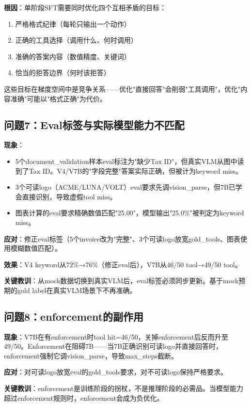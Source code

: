 \documentclass[fontset=none,11pt,a4paper]{ctexart}
\begin{document}
\textbf{根因}：单阶段SFT需要同时优化四个互相矛盾的目标：
\begin{enumerate}[label=(\arabic*),nosep]
    \item 严格格式纪律（每轮只输出一个动作）
    \item 正确的工具选择（调用什么、何时调用）
    \item 准确的答案内容（数值精度、关键词）
    \item 恰当的拒答边界（何时该拒答）
\end{enumerate}
这些目标在梯度空间中是竞争关系------优化"直接回答"会削弱"工具调用"，优化"内容准确"可能以"格式正确"为代价。

\subsection{问题7：Eval标签与实际模型能力不匹配}

\textbf{现象}：
\begin{itemize}[nosep]
    \item 5个document\_validation样本eval标注为"缺少Tax ID"，但真实VLM从图中读到了Tax ID。V4/V7B的"字段完整"答案实际正确，但被计为keyword miss。
    \item 3个可读logo（ACME/LUNA/VOLT）eval要求先调vision\_parse，但7B已学会直接识别，导致虚假tool miss。
    \item 图表计算的eval要求精确数值匹配"25.00"，模型输出"25.0\%"被判定为keyword miss。
\end{itemize}

\textbf{应对}：修正eval标签（5个invoice改为"完整"、3个可读logo放宽gold\_tools、图表使用模糊数值匹配）。

\textbf{效果}：V4 keyword从72\%→76\%（修正eval后），V7B从46/50 tool→49/50 tool。

\textbf{关键教训}：从mock数据切换到真实VLM后，eval标签必须同步更新。基于mock预期的gold label在真实VLM场景下不再准确。

\subsection{问题8：enforcement的副作用}

\textbf{现象}：V7B在有enforcement时tool hit=46/50，关掉enforcement后反而升至49/50。Enforcement在阻碍7B------当7B正确识别可读logo并直接回答时，enforcement强制它调vision\_parse，导致max\_steps截断。

\textbf{应对}：对可读logo放宽eval的gold\_tools要求，对不可读logo保持严格要求。

\textbf{关键教训}：enforcement是训练阶段的拐杖，不是推理阶段的必需品。当模型能力超过enforcement规则时，enforcement会成为负优化。
\end{document}
